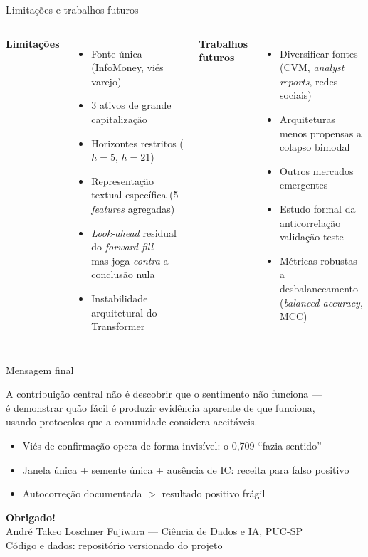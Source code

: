 \documentclass[11pt,aspectratio=169]{beamer}
\begin{document}
\begin{frame}{Limitações e trabalhos futuros}
  \begin{columns}[T]
    \textbf{Limitações}
    \begin{itemize}
      \item Fonte única (InfoMoney, viés varejo)
      \item 3 ativos de grande capitalização
      \item Horizontes restritos ($h=5$, $h=21$)
      \item Representação textual específica (5 \textit{features} agregadas)
      \item \textit{Look-ahead} residual do \textit{forward-fill} --- mas joga \emph{contra} a conclusão nula
      \item Instabilidade arquitetural do Transformer
    \end{itemize}
    \textbf{Trabalhos futuros}
    \begin{itemize}
      \item Diversificar fontes (CVM, \textit{analyst reports}, redes sociais)
      \item Arquiteturas menos propensas a colapso bimodal
      \item Outros mercados emergentes
      \item Estudo formal da anticorrelação validação-teste
      \item Métricas robustas a desbalanceamento (\textit{balanced accuracy}, MCC)
    \end{itemize}
  \end{columns}
\end{frame}

\begin{frame}{Mensagem final}
  \begin{block}{}
    \centering\large
    A contribuição central não é descobrir que o sentimento não funciona ---\\
    é demonstrar \alert{quão fácil é produzir evidência aparente de que funciona},\\
    usando protocolos que a comunidade considera aceitáveis.
  \end{block}
  \vspace{2ex}
  \begin{itemize}
    \item Viés de confirmação opera de forma invisível: o 0{,}709 ``fazia sentido''
    \item Janela única + semente única + ausência de IC: receita para falso positivo
    \item Autocorreção documentada $>$ resultado positivo frágil
  \end{itemize}
  \vspace{2ex}
  \centering
  \textbf{Obrigado!}\\[1ex]
  \footnotesize André Takeo Loschner Fujiwara --- Ciência de Dados e IA, PUC-SP\\
  Código e dados: repositório versionado do projeto
\end{frame}
\end{document}
